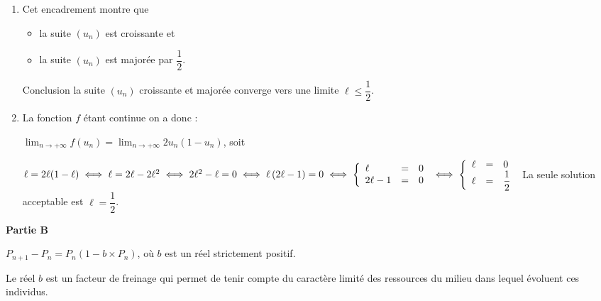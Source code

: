 \begin{enumerate}
\item 
Cet encadrement montre que 
\begin{itemize}
\item la suite $\left(u_n\right)$ est croissante et
\item la suite $\left(u_n\right)$ est majorée par $\dfrac12$.
\end{itemize}

Conclusion la suite $\left(u_n\right)$ croissante et majorée converge vers une limite $\ell \leqslant \dfrac12$.

\item 
La fonction $f$ étant continue on a donc :

$\displaystyle\lim_{n \to + \infty} f\left(u_n\right) = \displaystyle\lim_{n \to + \infty} 2u_n\left(1 - u_n\right)$, soit 

$\ell = 2\ell(1 - \ell) \iff \ell = 2\ell - 2\ell^2 \iff 2\ell^2 - \ell = 0 \iff \ell\left(2\ell - 1\right) = 0 \iff \left\{\begin{array}{l c l}
\ell&=&0\\
2\ell - 1&=&0
\end{array}\right. \iff \left\{\begin{array}{l c l}
\ell&=&0\\
\ell &=&\dfrac12
\end{array}\right.$ La seule solution acceptable est $\ell = \dfrac12$.
\end{enumerate}

\bigskip

\textbf{Partie B}

\medskip











\begin{center}$P_{n+1} -  P_n = P_n\left(1 -  b \times P_n\right)$, où $b$ est un réel strictement positif.\end{center}

Le réel $b$ est un facteur de freinage qui permet de tenir compte du caractère limité des
ressources du milieu dans lequel évoluent ces individus.

\medskip

